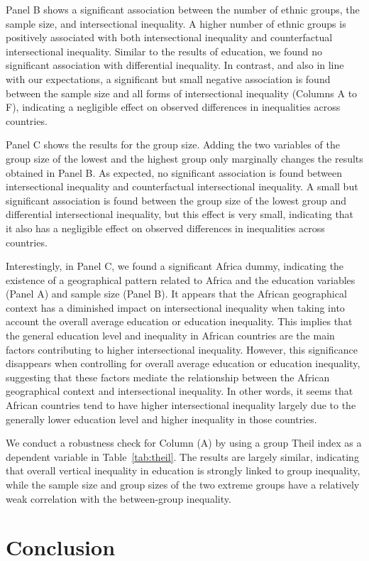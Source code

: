 Panel B shows a significant association between the number of ethnic groups, the sample size, and intersectional inequality. A higher number of ethnic groups is positively associated with both intersectional inequality and counterfactual intersectional inequality. Similar to the results of education, we found no significant association with differential inequality. In contrast, and also in line with our expectations, a significant but small negative association is found between the sample size and all forms of intersectional inequality (Columns A to F), indicating a negligible effect on observed differences in inequalities across countries.

Panel C shows the results for the group size. Adding the two variables of the group size of the lowest and the highest group only marginally changes the results obtained in Panel B. As expected, no significant association is found between intersectional inequality and counterfactual intersectional inequality. A small but significant association is found between the group size of the lowest group and differential intersectional inequality, but this effect is very small, indicating that it also has a negligible effect on observed differences in inequalities across countries. 

Interestingly, in Panel C, we found a significant Africa dummy, indicating the existence of a geographical pattern related to Africa and the education variables (Panel A) and sample size (Panel B). It appears that the African geographical context has a diminished impact on intersectional inequality when taking into account the overall average education or education inequality. This implies that the general education level and inequality in African countries are the main factors contributing to higher intersectional inequality. However, this significance disappears when controlling for overall average education or education inequality, suggesting that these factors mediate the relationship between the African geographical context and intersectional inequality. In other words, it seems that African countries tend to have higher intersectional inequality largely due to the generally lower education level and higher inequality in those countries.

We conduct a robustness check for Column (A) by using a group Theil index as a dependent variable in Table~\ref{tab:theil}. The results are largely similar, indicating that overall vertical inequality in education is strongly linked to group inequality, while the sample size and group sizes of the two extreme groups have a relatively weak correlation with the between-group inequality.
\hypertarget{conclusion}{%
\section{Conclusion}\label{sec:conclusion_ed}}

